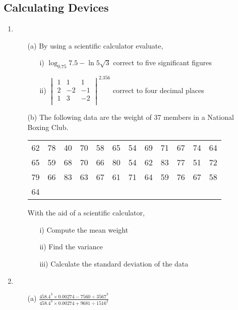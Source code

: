 \subsection{Calculating Devices}

\begin{enumerate}
	\item 
	\begin{enumerate}[topsep=0ex,itemsep=0ex,partopsep=1ex,parsep=1ex]
		\item[(a)] By using a scientific calculator evaluate,
		\begin{enumerate}[topsep=0ex,itemsep=0ex,partopsep=1ex,parsep=1ex]
			\item[i)] $\log_{0.75}{7.5} - \ln{5\sqrt{3}}$ correct to five significant figures
			\item[ii)] 	$\begin{vmatrix}
						1 & 1 & 1 \\
						2 & -2 & -1 \\
						1 & 3 & -2 \\
					\end{vmatrix}^{2.356}$ correct to four decimal places
		\end{enumerate}
		
		\item[(b)] The following data are the weight of 37 members in a National Boxing Club. 
		\begin{center}
			\begin{tabular}{cccccccccccc} 
				62 & 78 & 40 & 70 & 58 & 65 & 54 & 69 & 71 & 67 & 74 & 64 \\
				65 & 59 & 68 & 70 & 66 & 80 & 54 & 62 & 83 & 77 & 51 & 72 \\
				79 & 66 & 83 & 63 & 67 & 61 & 71 & 64 & 59 & 76 & 67 & 58 \\
				64 \\
			\end{tabular}
		\end{center}
		With the aid of a scientific calculator,
		\begin{enumerate}[topsep=0ex,itemsep=0ex,partopsep=1ex,parsep=1ex]
			\item[i)] Compute the mean weight
			\item[ii)] Find the variance
			\item[iii)] Calculate the standard deviation of the data
		\end{enumerate}
	\end{enumerate}
	
	\item 
	\begin{enumerate}[topsep=0ex,itemsep=0ex,partopsep=1ex,parsep=1ex]
		\item[(a)] $\frac{458.4^3 \times 0.00274 - 7560 \div 3567^3}{458.4^3 \times 0.00274 + 9681 \div 1516^2}$
		

\end{enumerate}
\end{enumerate}
